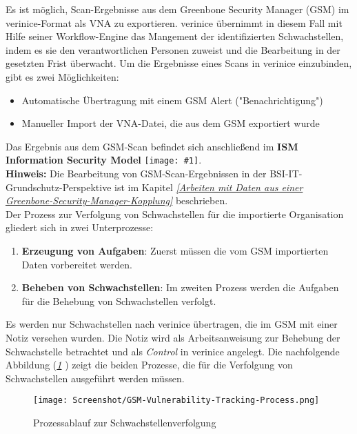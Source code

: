 \documentclass[a4paper,10pt]{book}
\newcommand{\icon}[1]{\texttt{[image: \#1]}}
\begin{document}
Es ist möglich, Scan-Ergebnisse aus dem Greenbone Security Manager (GSM) im
verinice-Format als VNA zu exportieren. verinice übernimmt in diesem Fall mit
Hilfe seiner Workflow-Engine das Mangement der identifizierten Schwachstellen,
indem es sie den verantwortlichen Personen zuweist und die Bearbeitung in der
gesetzten Frist überwacht. Um die Ergebnisse eines Scans in verinice
einzubinden, gibt es zwei Möglichkeiten:
 \begin{itemize}
 \item Automatische Übertragung mit einem GSM Alert ("Benachrichtigung")
 \item Manueller Import der VNA-Datei, die aus dem GSM exportiert wurde
\end{itemize}
Das Ergebnis aus dem GSM-Scan befindet sich anschließend im \textbf{ISM Information Security Model} \icon{Icon/Informationssicherheitsmodell.png}.
\newline\\
\textbf{Hinweis:} Die Bearbeitung von GSM-Scan-Ergebnissen in der BSI-IT-Grundschutz-Perspektive ist im Kapitel {\em \ref{Arbeiten mit Daten aus einer Greenbone-Security-Manager-Kopplung} } beschrieben.
\newline\\
Der Prozess zur Verfolgung von Schwachstellen für die importierte Organisation gliedert sich in zwei Unterprozesse:
\begin{enumerate}
 \item \textbf{Erzeugung von Aufgaben}: Zuerst müssen die vom GSM importierten
 Daten vorbereitet werden.
 \item \textbf{Beheben von Schwachstellen}: Im zweiten Prozess werden die
 Aufgaben für die Behebung von Schwachstellen verfolgt.
\end{enumerate}
Es werden nur Schwachstellen nach verinice übertragen, die im GSM mit einer Notiz versehen wurden. Die Notiz wird als Arbeitsanweisung zur Behebung der Schwachstelle betrachtet und als {\em Control} in verinice angelegt.
Die nachfolgende Abbildung ({\em \ref{Prozessablauf zur Schwachstellenverfolgung} }) zeigt die beiden Prozesse, die für die Verfolgung von Schwachstellen ausgeführt werden müssen.
\begin{figure}[htb!]
  \centering
  \texttt{[image: Screenshot/GSM-Vulnerability-Tracking-Process.png]}
  \caption{\label{Prozessablauf zur Schwachstellenverfolgung} Prozessablauf zur Schwachstellenverfolgung}
\end{figure}
\newline
\end{document}
